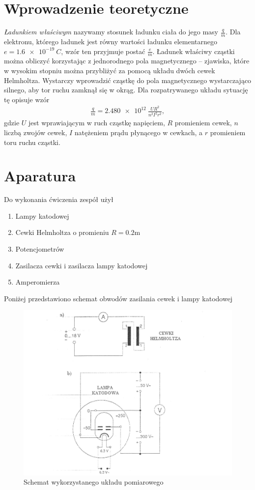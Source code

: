 \documentclass{article}
\begin{document}
\section{Wprowadzenie teoretyczne}

\emph{Ładunkiem właściwym} nazywamy stosunek ładunku ciała do jego
masy $\frac{q}{m}$. Dla elektronu, którego ładunek jest równy wartości
ładunku elementarnego $e = \SI{1.6e-19}{C}$, wzór ten przyjmuje postać
$\frac{e}{m}$. Ładunek właściwy cząstki można obliczyć korzystając z
jednorodnego pola magnetycznego -- zjawiska, które w wysokim stopniu
można przybliżyć za pomocą układu dwóch cewek Helmholtza. Wystarczy
wprowadzić cząstkę do pola magnetycznego wystarczająco silnego, aby tor
ruchu zamknął się w okrąg. Dla rozpatrywanego układu sytuację tę
opisuje wzór
\begin{align}
    \frac{q}{m} = \SI{2.480e12}{}\frac{UR^2}{n^2I^2r^2},
    \label{eq:em}
\end{align}
gdzie $U$ jest wprawiającym w ruch cząstkę napięciem, $R$ promieniem
cewek, $n$ liczbą zwojów cewek, $I$ natężeniem prądu płynącego w
cewkach, a $r$ promieniem toru ruchu cząstki.
\section{Aparatura}

Do wykonania ćwiczenia zespół użył 
\begin{enumerate}
    \item Lampy katodowej
    \item Cewki Helmholtza o promieniu $R = 0.2$m
    \item Potencjometrów
    \item Zasilacza cewki i zasilacza lampy katodowej
    \item Amperomierza
\end{enumerate}

Poniżej przedstawiono schemat obwodów zasilania cewek i lampy katodowej

\begin{figure}[H]
    \centering
    \includegraphics[scale=0.5]{cw45/schemat.png}
    \caption{Schemat wykorzystanego układu pomiarowego}
\end{figure}
\end{document}
